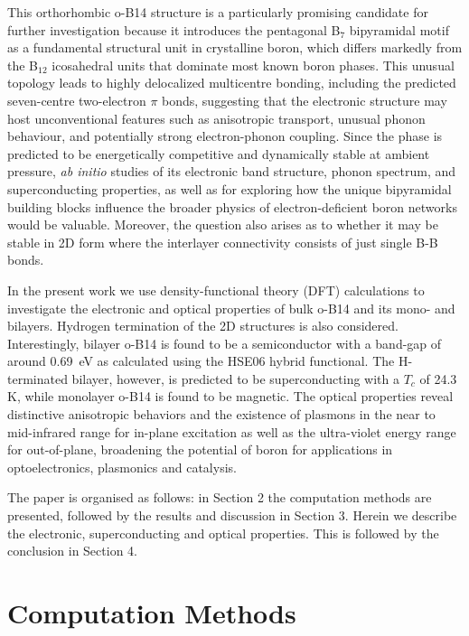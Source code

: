 \documentclass[aps,prb,preprint,notitlepage]{revtex4-2}
\begin{document}
This orthorhombic o-B14 structure is a particularly promising candidate 
for further investigation because it introduces the pentagonal 
B$_7$ bipyramidal motif as a fundamental structural unit in crystalline 
boron, which differs markedly from the B$_{12}$ icosahedral units that 
dominate most known boron phases. This unusual topology leads to highly 
delocalized multicentre bonding, including the predicted seven-centre 
two-electron $\pi$ bonds, suggesting that the electronic structure may 
host unconventional features such as anisotropic transport, unusual phonon 
behaviour, and potentially strong electron-phonon coupling. 
Since the phase is predicted to be energetically competitive and 
dynamically stable at ambient pressure, {\em ab initio} studies of 
its electronic band structure, phonon spectrum, and superconducting 
properties, as well as for exploring how the unique bipyramidal 
building blocks influence the broader physics of electron-deficient 
boron networks would be valuable. Moreover, the question also arises 
as to whether it may be stable in 2D form where 
the interlayer connectivity consists of just single B-B bonds.

In the present work we use density-functional theory
(DFT) calculations to investigate the electronic and optical
properties of bulk o-B14 and its mono- and bilayers. 
Hydrogen termination of the 2D structures is also considered. 
Interestingly, bilayer o-B14 is found to be a semiconductor with a band-gap of around
0.69~eV as calculated using the HSE06 hybrid functional.
The H-terminated bilayer, however, is predicted to be superconducting with 
a $T_c$ of 24.3 K, while monolayer o-B14 is found to be magnetic.
The optical properties reveal distinctive anisotropic behaviors and the existence
of plasmons in the near to mid-infrared range for in-plane excitation as
well as the ultra-violet energy range for out-of-plane,
broadening the potential of boron for applications 
in optoelectronics, plasmonics and catalysis.

The paper is organised as follows: in Section 2 the computation  methods are
presented, followed by the results and discussion in Section 3. Herein 
we describe the electronic, superconducting and optical properties.
This is followed by the  conclusion in Section 4.



\section{Computation Methods}
\end{document}
